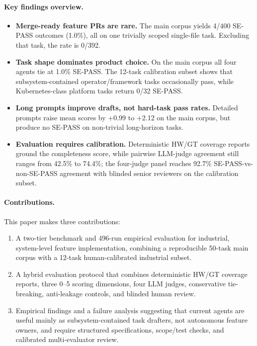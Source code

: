 \paragraph{Key findings overview.}
\begin{itemize}
  \item \textbf{Merge-ready feature PRs are rare.} The main corpus yields 4/400 SE-PASS outcomes (1.0\%), all on one trivially scoped single-file task. Excluding that task, the rate is 0/392.
  \item \textbf{Task shape dominates product choice.} On the main corpus all four agents tie at 1.0\% SE-PASS. The 12-task calibration subset shows that subsystem-contained operator/framework tasks occasionally pass, while Kubernetes-class platform tasks return 0/32 SE-PASS.
  \item \textbf{Long prompts improve drafts, not hard-task pass rates.} Detailed prompts raise mean scores by +0.99 to +2.12 on the main corpus, but produce no SE-PASS on non-trivial long-horizon tasks.
  \item \textbf{Evaluation requires calibration.} Deterministic HW/GT coverage reports ground the completeness score, while pairwise LLM-judge agreement still ranges from 42.5\% to 74.4\%; the four-judge panel reaches 92.7\% SE-PASS-vs-non-SE-PASS agreement with blinded senior reviewers on the calibration subset.
\end{itemize}

\paragraph{Contributions.}
This paper makes three contributions:
\begin{enumerate}\itemsep0pt
  \item A two-tier benchmark and 496-run empirical evaluation for industrial, system-level feature implementation, combining a reproducible 50-task main corpus with a 12-task human-calibrated industrial subset.
  \item A hybrid evaluation protocol that combines deterministic HW/GT coverage reports, three 0--5 scoring dimensions, four LLM judges, conservative tie-breaking, anti-leakage controls, and blinded human review.
  \item Empirical findings and a failure analysis suggesting that current agents are useful mainly as subsystem-contained task drafters, not autonomous feature owners, and require structured specifications, scope/test checks, and calibrated multi-evaluator review.
\end{enumerate}
